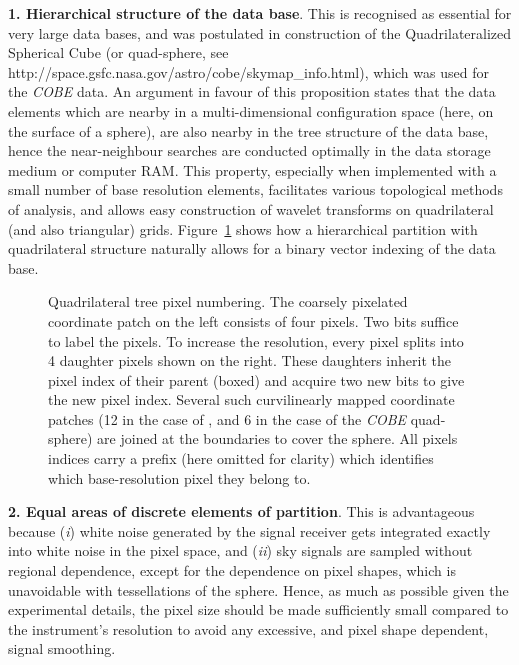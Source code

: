 \documentclass[12pt,twoside]{article}
\begin{document}
\textbf{1. Hierarchical structure of the data base}. This is recognised as 
essential for very large data bases, and was  postulated 
in construction
of the Quadrilateralized Spherical Cube 
(or quad-sphere, see 
{http://space.gsfc.nasa.gov/astro/cobe/skymap_info.html}), 
which was used for the
{\it COBE} data. An  argument in favour of this 
proposition
states that the data elements  
which are nearby in a multi-dimensional configuration space 
(here, on the surface of 
a sphere), are also nearby in the tree structure of the data base, hence
the near-neighbour searches are conducted optimally in the data storage medium
or computer RAM.
This property, especially when implemented with a small number of base
resolution elements, 
facilitates various topological methods of analysis, 
and allows easy construction
of wavelet transforms on quadrilateral (and also triangular) grids. 
Figure~\ref{fig:quadtree} %
shows how a hierarchical partition with 
quadrilateral structure naturally allows for a binary vector indexing
of the data base.

\begin{figure}[!ht]
\caption[Quadrilateral tree pixel numbering]%
{\label{fig:quadtree}%
Quadrilateral tree pixel numbering. 
The coarsely pixelated coordinate patch on
the left consists 
of four pixels. Two bits suffice to label the pixels. 
To increase the resolution, every 
pixel splits into 
4 daughter pixels shown on the right. These daughters inherit the pixel
index of their 
parent (boxed) and acquire 
two new bits to give the new pixel index. 
Several such curvilinearly mapped coordinate patches 
(12 in the case of \healpixns, and 6 in the case of the {\it COBE} quad-sphere) 
are joined at the boundaries to cover
the sphere. All pixels indices carry a prefix (here omitted for clarity) 
which identifies which base-resolution pixel they belong to.}
\end{figure}

\textbf{2. Equal areas of discrete elements of partition}. This is advantageous 
because ({\it i})
white noise generated by the  signal receiver 
gets integrated exactly into
white noise in the pixel space, and 
({\it ii}) sky signals are sampled without regional dependence, except for 
the dependence on pixel shapes, which is unavoidable with tessellations of the 
sphere. 
Hence, as much as possible given the experimental details, the pixel
size should be made sufficiently small compared to the 
instrument's resolution to avoid any excessive, and pixel shape dependent, 
signal smoothing.
\end{document}
